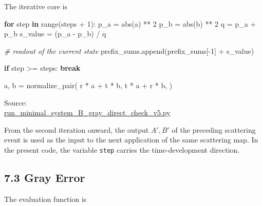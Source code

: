 \documentclass[
  10pt,
  a4paper,
]{article}
\newenvironment{Shaded}{}{}
\newcommand{\BuiltInTok}[1]{\textcolor[rgb]{0.00,0.50,0.00}{#1}}
\newcommand{\CommentTok}[1]{\textcolor[rgb]{0.38,0.63,0.69}{\textit{#1}}}
\newcommand{\ControlFlowTok}[1]{\textcolor[rgb]{0.00,0.44,0.13}{\textbf{#1}}}
\newcommand{\DecValTok}[1]{\textcolor[rgb]{0.25,0.63,0.44}{#1}}
\newcommand{\KeywordTok}[1]{\textcolor[rgb]{0.00,0.44,0.13}{\textbf{#1}}}
\newcommand{\NormalTok}[1]{#1}
\newcommand{\OperatorTok}[1]{\textcolor[rgb]{0.40,0.40,0.40}{#1}}
\begin{document}
The iterative core is

\begin{Shaded}
\begin{Highlighting}[]
\ControlFlowTok{for}\NormalTok{ step }\KeywordTok{in} \BuiltInTok{range}\NormalTok{(steps }\OperatorTok{+} \DecValTok{1}\NormalTok{):}
\NormalTok{    p\_a }\OperatorTok{=} \BuiltInTok{abs}\NormalTok{(a) }\OperatorTok{**} \DecValTok{2}
\NormalTok{    p\_b }\OperatorTok{=} \BuiltInTok{abs}\NormalTok{(b) }\OperatorTok{**} \DecValTok{2}
\NormalTok{    q }\OperatorTok{=}\NormalTok{ p\_a }\OperatorTok{+}\NormalTok{ p\_b}
\NormalTok{    s\_value }\OperatorTok{=}\NormalTok{ (p\_a }\OperatorTok{{-}}\NormalTok{ p\_b) }\OperatorTok{/}\NormalTok{ q}

    \CommentTok{\# readout of the current state}
\NormalTok{    prefix\_sums.append(prefix\_sums[}\OperatorTok{{-}}\DecValTok{1}\NormalTok{] }\OperatorTok{+}\NormalTok{ s\_value)}

    \ControlFlowTok{if}\NormalTok{ step }\OperatorTok{\textgreater{}=}\NormalTok{ steps:}
        \ControlFlowTok{break}

\NormalTok{    a, b }\OperatorTok{=}\NormalTok{ normalize\_pair(}
\NormalTok{        r }\OperatorTok{*}\NormalTok{ a }\OperatorTok{+}\NormalTok{ t }\OperatorTok{*}\NormalTok{ b,}
\NormalTok{        t }\OperatorTok{*}\NormalTok{ a }\OperatorTok{+}\NormalTok{ r }\OperatorTok{*}\NormalTok{ b,}
\NormalTok{    )}
\end{Highlighting}
\end{Shaded}

Source:\\
\href{../20260715/run_minimal_system_B_gray_direct_check_v5.py\#L81-L136}{run\_minimal\_system\_B\_gray\_direct\_check\_v5.py}

From the second iteration onward, the output \(A',B'\) of the preceding
scattering event is used as the input to the next application of the
same scattering map. In the present code, the variable \texttt{step}
carries the time-development direction.

\subsection{7.3 Gray Error}\label{gray-error}

The evaluation function is
\end{document}
